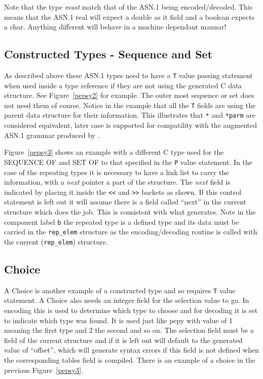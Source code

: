 Note that the type {\em must} match that of the ASN.1 being
encoded/decoded.
This means that the ASN.1 real will expect a double as it field and
a boolean expects a char.
Anything different will behave in a machine dependant mannar!

\subsection{Constructed Types - Sequence and Set}

As described above these ASN.1 types need to have a \verb"T" value
passing statement when used inside a type reference
if they are not using the  generated C data structure.
See Figure~\ref{pepsy2} for example.
The outer most sequence or set does not need them of course.
Notice in the example that all the \verb"T" fields are using the
parent data structure for their information.
This illustrates that \verb"*" and \verb"*parm" are considered equivalent,
later case is supported for compatility with the augmented ASN.1 grammar
produced by .

Figure~\ref{pepsy3} shows an example with a different C type used for
the SEQUENCE OF and SET OF to that specified in the \verb"P" value statement.
In the case of the repeating types it is necessary to have a link list
to carry the information, with a {\em next} pointer a part of the structure.
The {\em next} field is indicated by placing it inside the \verb"<<" and
\verb">>" backets as shown.
If this control statement is left out it will assume there is a field
called ``next'' in the current structure which does the job.
This is consistent with what  generates.
Note in the component label \verb"b" the repeated type is a defined type
and its data must be carried in the \verb"rep_elem" structure as the
encoding/decoding routine is called with the current (\verb"rep_elem")
structure.


\subsection{Choice}

A Choice is another example of a constructed type and so requires
\verb"T" value statement.
A Choice also needs an integer field for the selection value to go.
In encoding this is used to determine which type to choose and for decoding
it is set to indicate which type was found.
It is used just like pepy with value of 1 meaning the first type and 2
the second and so on.
The selection field must be a field of the current structure and if it is
left out will default to the  generated value of ``offset'', which
will generate syntax errors if this field is not defined when the corresponding
tables field is compiled.
There is an example of a choice in the previous Figure~\ref{pepsy3}.

